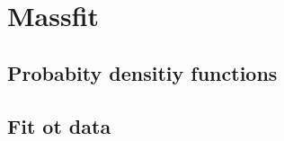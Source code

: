 \chapter{Massfit}

\blindtext

\section{Probabity densitiy functions}

\Blindtext

\section{Fit ot data}

\Blindtext
